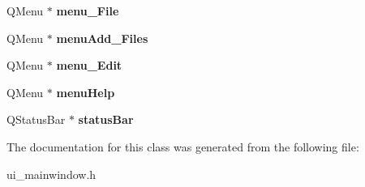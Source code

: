\begin{DoxyCompactItemize}
\item 
\hypertarget{classUi__MainWindow_a6d6a92a6bccde97ab13fce9014eb25d4}{
QMenu $\ast$ {\bfseries menu\_\-File}}
\label{classUi__MainWindow_a6d6a92a6bccde97ab13fce9014eb25d4}

\item 
\hypertarget{classUi__MainWindow_a041df64e03e576dd5318db1d942f0c56}{
QMenu $\ast$ {\bfseries menuAdd\_\-Files}}
\label{classUi__MainWindow_a041df64e03e576dd5318db1d942f0c56}

\item 
\hypertarget{classUi__MainWindow_a11f322f3af9857e5138c8024d84d0279}{
QMenu $\ast$ {\bfseries menu\_\-Edit}}
\label{classUi__MainWindow_a11f322f3af9857e5138c8024d84d0279}

\item 
\hypertarget{classUi__MainWindow_ab95dbfbb0550206aeac76db36f491548}{
QMenu $\ast$ {\bfseries menuHelp}}
\label{classUi__MainWindow_ab95dbfbb0550206aeac76db36f491548}

\item 
\hypertarget{classUi__MainWindow_a50fa481337604bcc8bf68de18ab16ecd}{
QStatusBar $\ast$ {\bfseries statusBar}}
\label{classUi__MainWindow_a50fa481337604bcc8bf68de18ab16ecd}

\end{DoxyCompactItemize}


The documentation for this class was generated from the following file:\begin{DoxyCompactItemize}
\item 
ui\_\-mainwindow.h\end{DoxyCompactItemize}
